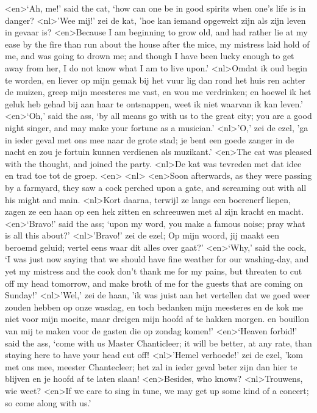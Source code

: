 <en>‘Ah, me!’ said the cat, ‘how can one be in good spirits when one’s life is in danger?
<nl>'Wee mij!' zei de kat, 'hoe kan iemand opgewekt zijn als zijn leven in gevaar is?
<en>Because I am beginning to grow old, and had rather lie at my ease by the fire than run about the house after the mice, my mistress laid hold of me, and was going to drown me; and though I have been lucky enough to get away from her, I do not know what I am to live upon.’
<nl>Omdat ik oud begin te worden, en liever op mijn gemak bij het vuur lig dan rond het huis ren achter de muizen, greep mijn meesteres me vast, en wou me verdrinken; en hoewel ik het geluk heb gehad bij aan haar te ontsnappen, weet ik niet waarvan ik kan leven.'
<en>‘Oh,’ said the ass, ‘by all means go with us to the great city; you are a good night singer, and may make your fortune as a musician.’
<nl>'O,' zei de ezel, 'ga in ieder geval met ons mee naar de grote stad; je bent een goede zanger in de nacht en zou je fortuin kunnen verdienen als muzikant.'
<en>The cat was pleased with the thought, and joined the party.
<nl>De kat was tevreden met dat idee en trad toe tot de groep.
<en>
<nl>
<en>Soon afterwards, as they were passing by a farmyard, they saw a cock perched upon a gate, and screaming out with all his might and main.
<nl>Kort daarna, terwijl ze langs een boerenerf liepen, zagen ze een haan op een hek zitten en schreeuwen met al zijn kracht en macht.
<en>‘Bravo!’ said the ass; ‘upon my word, you make a famous noise; pray what is all this about?’
<nl>'Bravo!' zei de ezel; Op mijn woord, jij  maakt een beroemd geluid; vertel eens waar  dit alles over gaat?'
<en>‘Why,’ said the cock, ‘I was just now saying that we should have fine weather for our washing-day, and yet my mistress and the cook don’t thank me for my pains, but threaten to cut off my head tomorrow, and make broth of me for the guests that are coming on Sunday!’
<nl>'Wel,' zei de haan, 'ik was juist aan het vertellen dat we goed weer zouden hebben op onze wasdag, en toch bedanken mijn meesteres en de kok me niet voor mijn moeite, maar dreigen  mijn hoofd af te hakken morgen. en  bouillon van mij te maken voor de gasten die op zondag komen!'
<en>‘Heaven forbid!’ said the ass, ‘come with us Master Chanticleer; it will be better, at any rate, than staying here to have your head cut off!
<nl>'Hemel verhoede!' zei de ezel, 'kom met ons mee, meester Chantecleer; het zal in ieder geval beter zijn dan hier te blijven en  je hoofd af te laten slaan!
<en>Besides, who knows?
<nl>Trouwens, wie weet?
<en>If we care to sing in tune, we may get up some kind of a concert; so come along with us.’
